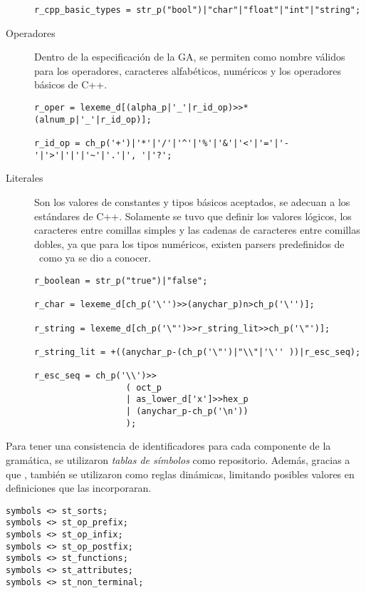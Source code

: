 \begin{description}
\begin{lstlisting}[columns=fullflexible, linewidth=12.6cm]
r_cpp_basic_types = str_p("bool")|"char"|"float"|"int"|"string";
\end{lstlisting}

\item [Operadores] Dentro de la especificación de la GA, se permiten como nombre válidos para los operadores, caracteres alfabéticos, numéricos y los operadores básicos de C++. 

\begin{lstlisting}[columns=fullflexible, linewidth=11.5cm]
r_oper = lexeme_d[(alpha_p|'_'|r_id_op)>>*(alnum_p|'_'|r_id_op)];

r_id_op = ch_p('+')|'*'|'/'|'^'|'%'|'&'|'<'|'='|'-'|'>'|'|'|'~'|'.'|', '|'?';
\end{lstlisting}

\item [Literales] Son los valores de constantes y tipos básicos aceptados, se adecuan a los estándares de C++. Solamente se tuvo que definir los valores lógicos, los caracteres entre comillas simples y las cadenas de caracteres entre comillas dobles, ya que para los tipos numéricos, existen parsers predefinidos de \spirit\ como ya se dio a conocer.

\begin{lstlisting}[columns=fullflexible, linewidth=10.7cm]
r_boolean = str_p("true")|"false";

r_char = lexeme_d[ch_p('\'')>>(anychar_p)n>ch_p('\'')];

r_string = lexeme_d[ch_p('\"')>>r_string_lit>>ch_p('\"')];

r_string_lit = +((anychar_p-(ch_p('\"')|"\\"|'\'' ))|r_esc_seq);

r_esc_seq = ch_p('\\')>>
                  ( oct_p
                  | as_lower_d['x']>>hex_p
                  | (anychar_p-ch_p('\n'))
                  );
\end{lstlisting}
\end{description}

Para tener una consistencia de identificadores para cada componente de la gramática, se utilizaron \textit{tablas de símbolos} como repositorio. Además, gracias a que \spirit, también se utilizaron como reglas dinámicas, limitando posibles valores en definiciones que las incorporaran.

\begin{lstlisting}[columns=fullflexible, linewidth=5.5cm]
symbols <> st_sorts;
symbols <> st_op_prefix;
symbols <> st_op_infix;
symbols <> st_op_postfix;
symbols <> st_functions;
symbols <> st_attributes;
symbols <> st_non_terminal;
\end{lstlisting}

